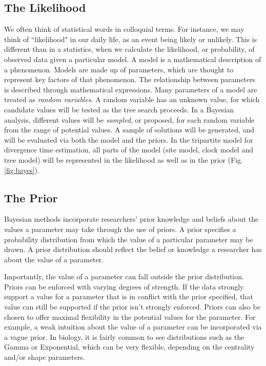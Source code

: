 \documentclass[11pt]{article}
\newcommand{\rw}[1]{{\textcolor{red}{[RW: #1]}}} %
\begin{document}
\subsection{The Likelihood}

We often think of statistical words in colloquial terms.
For instance, we may think of ``likelihood" in our daily life, as an event being likely or unlikely. 
This is different than in a statistics, when we calculate the likelihood, or probability, of observed data given a particular model.
A model is a mathematical description of a phenomenon.
Models are made up of parameters, which are thought to represent key factors of that phenomenon.
The relationship between parameters is described through mathematical expressions.
Many parameters of a model are treated as \textit{random variables}.
A random variable has an unknown value, for which candidate values will be tested as the tree search proceeds. 
In a Bayesian analysis, different values will be \textit{sampled}, or proposed, for each random variable from the range of potential values.
A sample of solutions will be generated, and will be evaluated via both the model and the priors.
In the tripartite model for divergence time estimation, all parts of the model (site model, clock model and tree model) will be represented in the likelihood as well as in the prior (Fig. \ref{fig:bayes}).


\subsection{The Prior}


Bayesian methods incorporate researchers' prior knowledge and beliefs about the values a parameter may take through the use of priors.
A prior specifies a probability distribution from which the value of a particular parameter may be drawn.
A prior distribution should reflect the belief or knowledge a researcher has about the value of a parameter.

Importantly, the value of a parameter can fall outside the prior distribution.
Priors can be enforced with varying degrees of strength.
If the data strongly support a value for a parameter that is in conflict with the prior specified, that value can still be supported if the prior isn't strongly enforced.
Priors can also be chosen to offer maximal flexibility in the potential values for the parameter.
For example, a weak intuition about the value of a parameter can be incorporated via a vague prior.
In biology, it is fairly common to see distributions such as the Gamma or Exponential, which can be very flexible, depending on the centrality and/or shape parameters.
\end{document}
